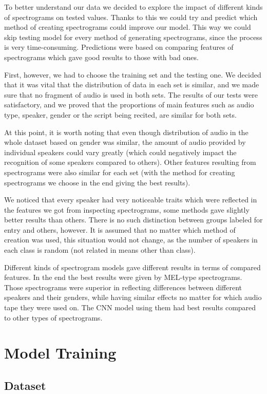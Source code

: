 \documentclass[11pt, letterpaper]{article}
\begin{document}
To better understand our data we decided to explore the impact of different kinds of spectrograms on tested values. Thanks to this we could try and predict which method of creating spectrograms could improve our model. This way we could skip testing model for every method of generating spectrograms, since the process is very time-consuming. Predictions were based on comparing features of spectrograms which gave good results to those with bad ones. 

First, however, we had to choose the training set and the testing one. We decided that it was vital that the distribution of data in each set is similar, and we made sure that no fragment of audio is used in both sets.  The results of our tests were satisfactory, and we proved that the proportions of main features such as audio type, speaker, gender or the script being recited, are similar for both sets.

At this point, it is worth noting that even though distribution of audio in the whole dataset based on gender was similar, the amount of audio provided by individual speakers could vary greatly (which could negatively impact the recognition of some speakers compared to others). Other features resulting from spectrograms were also similar for each set (with the method for creating spectrograms we choose in the end giving the best results). 

We noticed that every speaker had very noticeable traits which were reflected in the features we got from inspecting spectrograms, some methods gave slightly better results than others. There is no such distinction between groups labeled for entry and others, however. It is assumed that no matter which method of creation was used, this situation would not change, as the number of speakers in each class is random (not related in means other than class).

Different kinds of spectrogram models gave different results in terms of compared features. In the end the best results were given by MEL-type spectrograms. Those spectrograms were superior in reflecting differences between different speakers and their genders, while having similar effects no matter for which audio tape they were used on. The CNN model using them had best results compared to other types of spectrograms.

\section{Model Training}
\subsection{Dataset}
\end{document}
